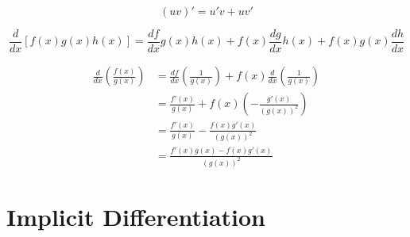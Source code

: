 \begin{equation*}
    (uv)' = u' v + uv'
\end{equation*}

\begin{equation*}
    \frac{d}{dx} \left[f(x)g(x)h(x)\right] = \frac{df}{dx} g(x)h(x) + f(x)\frac{dg}{dx} h(x) + f(x)g(x) \frac{dh}{dx}
\end{equation*}

\begin{align*}
    \frac{d}{dx}\left(\frac{f(x)}{g(x)}\right) &= \frac{df}{dx}\left(\frac{1}{g(x)}\right) + f(x)\frac{d}{dx}\left(\frac{1}{g(x)}\right)\\
    &= \frac{f'(x)}{g(x)} + f(x)\left(- \frac{g'(x)}{(g(x))^2}\right)\\
    &= \frac{f'(x)}{g(x)} - \frac{f(x)g'(x)}{(g(x))^{2}}\\
    &= \frac{f'(x)g(x) - f(x)g'(x)}{(g(x))^{2}}
\end{align*}

\section{Implicit Differentiation}